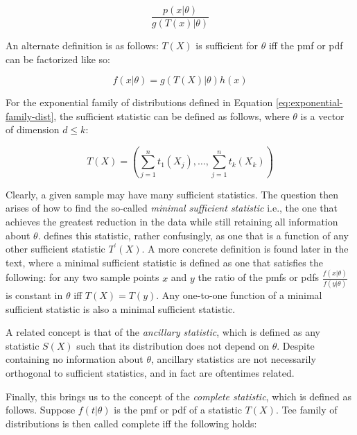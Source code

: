\documentclass{report}
\begin{document}
\begin{equation}\label{eq:sufficient-stat}
    \frac{p(x|\theta)}{g(T(x)|\theta)}
\end{equation}

An alternate definition is as follows: $T(X)$ is sufficient for $\theta$ \gls{iff} the \gls{pmf} or \gls{pdf} can be factorized like so:

\begin{equation}\label{eq:pdf-pmf-factorization}
    f(x|\theta) = g(T(X)|\theta)h(x)
\end{equation}

For the exponential family of distributions defined in Equation \ref{eq:exponential-family-dist}, the sufficient statistic can be defined as follows, where $\theta$ is a vector of dimension $d \leq k$:

\begin{equation}\label{eq:sufficient-stat-exponential-family}
    T(X) = \left(\sum_{j=1}^n t_1(X_j), \dots, \sum_{j=1}^n t_k(X_k)\right)
\end{equation}

Clearly, a given sample may have many sufficient statistics. The question then arises of how to find the so-called \textit{minimal sufficient statistic} i.e., the one that achieves the greatest reduction in the data while still retaining all information about $\theta$. \cite[Chapter~6.2.2]{casella_statistical_2002} defines this statistic, rather confusingly, as one that is a function of any other sufficient statistic $T^\prime(X)$. A more concrete definition is found later in the text, where a minimal sufficient statistic is defined as one that satisfies the following: for any two sample points $x$ and $y$ the ratio of the \glspl{pmf} or \glspl{pdf} $\frac{f(x|\theta)}{f(y|\theta)}$ is constant in $\theta$ \gls{iff} $T(X) = T(y)$. Any one-to-one function of a minimal sufficient statistic is also a minimal sufficient statistic. 

A related concept is that of the \textit{ancillary statistic}, which is defined as any statistic $S(X)$ such that its distribution does not depend on $\theta$. Despite containing no information about $\theta$, ancillary statistics are not necessarily orthogonal to sufficient statistics, and in fact are oftentimes related. 

Finally, this brings us to the concept of the \textit{complete statistic}, which is defined as follows. Suppose $f(t|\theta)$ is the \gls{pmf} or \gls{pdf} of a statistic $T(X)$. Tee family of distributions is then called complete \gls{iff} the following holds:
\end{document}
